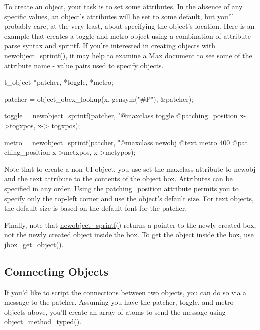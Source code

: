 To create an object, your task is to set some attributes. In the absence of any specific values, an object's attributes will be set to some default, but you'll probably care, at the very least, about specifying the object's location. Here is an example that creates a toggle and metro object using a combination of attribute parse syntax and sprintf. If you're interested in creating objects with \hyperlink{group__obj_gad81c665a20c3c707decaf3403468ff47}{newobject\_\-sprintf()}, it may help to examine a Max document to see some of the attribute name -\/ value pairs used to specify objects.


\begin{DoxyCode}
        t_object *patcher, *toggle, *metro;

        patcher = object_obex_lookup(x, gensym("#P"), &patcher);

        toggle = newobject_sprintf(patcher, "@maxclass toggle @patching_position 
            x->togxpos, x-> togxpos);

        metro = newobject_sprintf(patcher, "@maxclass newobj @text metro 400 @pat
      ching_position %
            x->metxpos, x->metypos);
\end{DoxyCode}


Note that to create a non-\/UI object, you use set the maxclass attribute to newobj and the text attribute to the contents of the object box. Attributes can be specified in any order. Using the patching\_\-position attribute permits you to specify only the top-\/left corner and use the object's default size. For text objects, the default size is based on the default font for the patcher.

Finally, note that \hyperlink{group__obj_gad81c665a20c3c707decaf3403468ff47}{newobject\_\-sprintf()} returns a pointer to the newly created box, not the newly created object inside the box. To get the object inside the box, use \hyperlink{group__jbox_ga5063d165cfca9dc76162ff5757ea4852}{jbox\_\-get\_\-object()}.\hypertarget{chapter_scripting_chapter_scripting_objects_connecting}{}\subsection{Connecting Objects}\label{chapter_scripting_chapter_scripting_objects_connecting}
If you'd like to script the connections between two objects, you can do so via a message to the patcher. Assuming you have the patcher, toggle, and metro objects above, you'll create an array of atoms to send the message using \hyperlink{group__obj_ga443dee482af22e0fe83e68955d367226}{object\_\-method\_\-typed()}.


